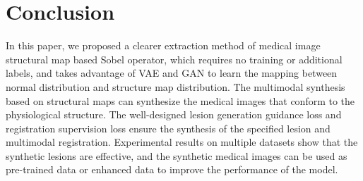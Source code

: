 \documentclass[runningheads]{llncs}
\begin{document}
	\section{Conclusion}
	In this paper, we proposed a clearer extraction method of medical image structural map based Sobel operator, which requires no training or additional labels, and takes advantage of VAE and GAN to learn the mapping between normal distribution and structure map distribution. The multimodal synthesis based on structural maps can synthesize the medical images that conform to the physiological structure. The well-designed lesion generation guidance loss and registration supervision loss ensure the synthesis of the specified lesion and multimodal registration. Experimental results on multiple datasets show that the synthetic lesions are effective, and the synthetic medical images can be used as pre-trained data or enhanced data to improve the performance of the model.
	
		
\end{document}
